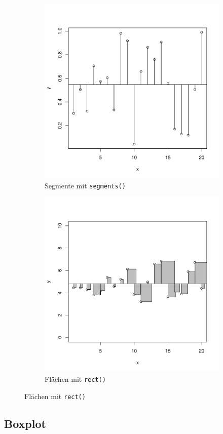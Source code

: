\begin{figure}[h!]
\begin{subfigure}[b]{0.48\textwidth}
\includegraphics{r-cmd-016}
\caption{Segmente mit \lstinline{segments()}}
\end{subfigure}
\begin{subfigure}[b]{0.48\textwidth}
\includegraphics{r-cmd-017}
\caption{Flächen mit \lstinline{rect()}}
\end{subfigure}

\end{figure}

\subsection{Boxplot}
